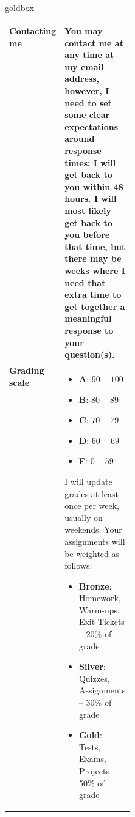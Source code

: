 \documentclass[12pt]{article}
\begin{document}
    \renewcommand{\arraystretch}{1.6}
    \begin{skillbox}{goldbox}
        \renewcommand{\arraystretch}{1.35}
        \begin{tabularx}{\linewidth}{
                >{\bfseries}p{0.24\linewidth}
            X
        }
        \endhead
        {Contacting me}
        & {You may contact me at any time at my email address, however,
        I need to set some clear expectations around response times:
        I will get back to you within 48 hours.
        I will most likely get back to you before that time, but there may be
        weeks where I need that extra time to get together a meaningful response to your question(s).}
        \\[1em]
        \hline

        {Grading scale}
        &
        \begin{minipage}[t]{\linewidth}
            \begin{itemize}
                \item \textbf{A}: $90-100$
                \item \textbf{B}: $80-89$
                \item \textbf{C}: $70-79$
                \item \textbf{D}: $60-69$
                \item \textbf{F}: $0-59$
            \end{itemize}
        I will update grades at least once per week, usually on weekends.
        Your assignments will be weighted as follows:
        \begin{itemize}
            \item \textbf{Bronze}: Homework, Warm-ups, Exit Tickets -- 20\% of grade
            \item \textbf{Silver}: Quizzes, Assignments -- 30\% of grade
            \item \textbf{Gold}: Tests, Exams, Projects -- 50\% of grade
        \end{itemize}
        \end{minipage}
        \\ \hline
        \end{tabularx}
    \end{skillbox}
\end{document}
